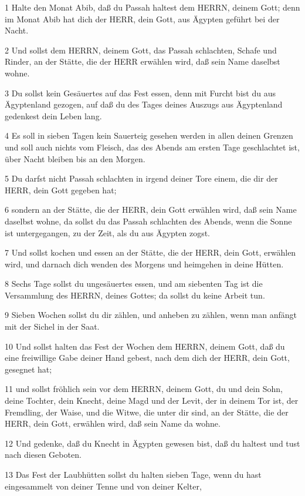 \par 1 Halte den Monat Abib, daß du Passah haltest dem HERRN, deinem Gott; denn im Monat Abib hat dich der HERR, dein Gott, aus Ägypten geführt bei der Nacht.
\par 2 Und sollst dem HERRN, deinem Gott, das Passah schlachten, Schafe und Rinder, an der Stätte, die der HERR erwählen wird, daß sein Name daselbst wohne.
\par 3 Du sollst kein Gesäuertes auf das Fest essen, denn mit Furcht bist du aus Ägyptenland gezogen, auf daß du des Tages deines Auszugs aus Ägyptenland gedenkest dein Leben lang.
\par 4 Es soll in sieben Tagen kein Sauerteig gesehen werden in allen deinen Grenzen und soll auch nichts vom Fleisch, das des Abends am ersten Tage geschlachtet ist, über Nacht bleiben bis an den Morgen.
\par 5 Du darfst nicht Passah schlachten in irgend deiner Tore einem, die dir der HERR, dein Gott gegeben hat;
\par 6 sondern an der Stätte, die der HERR, dein Gott erwählen wird, daß sein Name daselbst wohne, da sollst du das Passah schlachten des Abends, wenn die Sonne ist untergegangen, zu der Zeit, als du aus Ägypten zogst.
\par 7 Und sollst kochen und essen an der Stätte, die der HERR, dein Gott, erwählen wird, und darnach dich wenden des Morgens und heimgehen in deine Hütten.
\par 8 Sechs Tage sollst du ungesäuertes essen, und am siebenten Tag ist die Versammlung des HERRN, deines Gottes; da sollst du keine Arbeit tun.
\par 9 Sieben Wochen sollst du dir zählen, und anheben zu zählen, wenn man anfängt mit der Sichel in der Saat.
\par 10 Und sollst halten das Fest der Wochen dem HERRN, deinem Gott, daß du eine freiwillige Gabe deiner Hand gebest, nach dem dich der HERR, dein Gott, gesegnet hat;
\par 11 und sollst fröhlich sein vor dem HERRN, deinem Gott, du und dein Sohn, deine Tochter, dein Knecht, deine Magd und der Levit, der in deinem Tor ist, der Fremdling, der Waise, und die Witwe, die unter dir sind, an der Stätte, die der HERR, dein Gott, erwählen wird, daß sein Name da wohne.
\par 12 Und gedenke, daß du Knecht in Ägypten gewesen bist, daß du haltest und tust nach diesen Geboten.
\par 13 Das Fest der Laubhütten sollst du halten sieben Tage, wenn du hast eingesammelt von deiner Tenne und von deiner Kelter,
